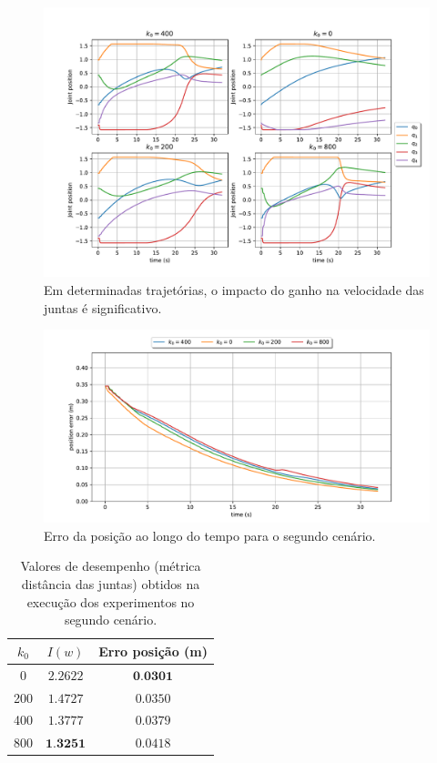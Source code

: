 \begin{figure}
	\centering
	\includegraphics[width=\textwidth]{./Images/2024-07-02-14-04-38/joint_states_joint_distance.pdf}
	\caption{Em determinadas trajetórias, o impacto do ganho na velocidade das juntas é significativo.}\label{fig:exp3-joint-states}
\end{figure}

\begin{figure}
	\centering
	\includegraphics[width=\textwidth]{./Images/2024-07-02-14-04-38/position_error_joint_distance.pdf}
	\caption{Erro da posição ao longo do tempo para o segundo cenário.}\label{fig:exp3-error}
\end{figure}

\begin{table}[htbp]
    \centering
    \begin{tabular}{ccc}
        \toprule
        \( k_0 \) & \( I(w) \) & Erro posição (m) \\
        \midrule
        0  & \( 2.2622 \) & \( \textbf{0.0301} \) \\
        200  & \( 1.4727 \) & \( 0.0350 \) \\
        400  & \( 1.3777 \) & \( 0.0379 \) \\
        800  & \( \textbf{1.3251} \) & \( 0.0418 \) \\
        \bottomrule
    \end{tabular}
    \caption{Valores de desempenho (métrica distância das juntas) obtidos na execução dos experimentos no segundo cenário.}
    \label{tab:scores-exp3}
\end{table}
